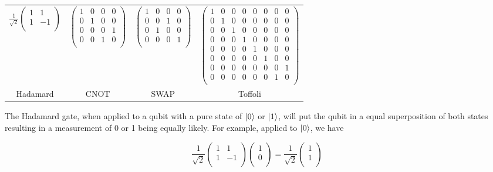 \documentclass[11pt]{report}
\newcommand{\?}{\stackrel{?}{=}}
\begin{document}
\begin{table}[h!]
\centering
\begin{tabular}{ c c c c }
$\frac{1}{\sqrt{2}}\begin{pmatrix}
1 & 1 \\
1 & -1 \\
\end{pmatrix}$ &
$\begin{pmatrix}
1 & 0 & 0 & 0 \\
0 & 1 & 0 & 0 \\
0 & 0 & 0 & 1 \\
0 & 0 & 1 & 0 \\
\end{pmatrix}$ & 
$\begin{pmatrix}
1 & 0 & 0 & 0 \\
0 & 0 & 1 & 0 \\
0 & 1 & 0 & 0 \\
0 & 0 & 0 & 1 \\
\end{pmatrix}$ & 
$\begin{pmatrix}
1 & 0 & 0 & 0 & 0 & 0 & 0 & 0 \\
0 & 1 & 0 & 0 & 0 & 0 & 0 & 0 \\
0 & 0 & 1 & 0 & 0 & 0 & 0 & 0 \\
0 & 0 & 0 & 1 & 0 & 0 & 0 & 0 \\
0 & 0 & 0 & 0 & 1 & 0 & 0 & 0 \\
0 & 0 & 0 & 0 & 0 & 1 & 0 & 0 \\
0 & 0 & 0 & 0 & 0 & 0 & 0 & 1 \\
0 & 0 & 0 & 0 & 0 & 0 & 1 & 0 \\
\end{pmatrix}$ \\
  Hadamard & CNOT & SWAP & Toffoli \\
\end{tabular}
\end{table}

The Hadamard gate, when applied to a qubit with a pure state of $\ket{0}$ or $\ket{1}$, will put the qubit in a equal superposition of both states resulting in a measurement of 0 or 1 being equally likely. For example, applied to $\ket{0}$, we have

$$\frac{1}{\sqrt{2}}\begin{pmatrix}
1 & 1 \\
1 & -1 \\
\end{pmatrix} \begin{pmatrix}
1 \\
0 \\
\end{pmatrix} = \frac{1}{\sqrt{2}} \begin{pmatrix}
1 \\
1 \\
\end{pmatrix}$$
\end{document}
